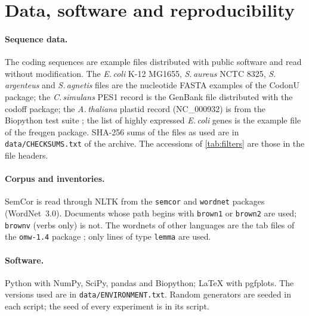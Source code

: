 \section{Data, software and reproducibility}\label{app:data}
\paragraph{Sequence data.} The coding sequences are example files distributed with public software and read without modification. The \emph{E.\,coli} K-12 MG1655, \emph{S.\,aureus} NCTC 8325, \emph{S.\,argenteus} and \emph{S.\,agnetis} files are the nucleotide FASTA examples of the CodonU package; the \emph{C.\,simulans} PES1 record is the GenBank file distributed with the codoff package; the \emph{A.\,thaliana} plastid record (NC\_000932) is from the Biopython test suite \citep{cock2009}; the list of highly expressed \emph{E.\,coli} genes is the example file of the freqgen package. SHA-256 sums of the files as used are in \texttt{data/CHECKSUMS.txt} of the archive. The accessions of \cref{tab:filters} are those in the file headers.
\paragraph{Corpus and inventories.} SemCor is read through NLTK \citep{bird2009} from the \texttt{semcor} and \texttt{wordnet} packages (WordNet~3.0). Documents whose path begins with \texttt{brown1} or \texttt{brown2} are used; \texttt{brownv} (verbs only) is not. The wordnets of other languages are the tab files of the \texttt{omw-1.4} package \citep{bond2013}; only lines of type \texttt{lemma} are used.
\paragraph{Software.} Python with NumPy, SciPy, pandas and Biopython; LaTeX with pgfplots. The versions used are in \texttt{data/ENVIRONMENT.txt}. Random generators are seeded in each script; the seed of every experiment is in its script.
